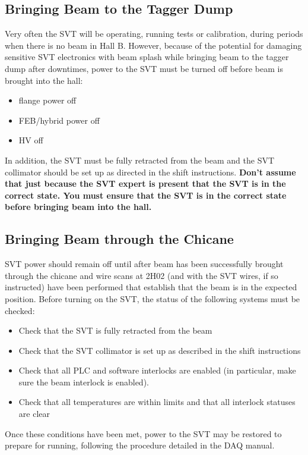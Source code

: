 \documentclass[12pt]{report}
\begin{document}
\subsection{Bringing Beam to the Tagger Dump}
Very often the SVT will be operating, running tests or calibration, during periods when there is no beam in Hall B. However, because of the potential for damaging sensitive SVT electronics with beam splash while bringing beam to the tagger dump after downtimes, power to the SVT must be turned off before beam is brought into the hall:  
\begin{itemize}
\item flange power off
\item FEB/hybrid power off
\item HV off
\end {itemize}
In addition, the SVT must be fully retracted from the beam and the SVT collimator should be set up as directed in the shift instructions.  \textbf{Don't assume that just because the SVT expert is present that the SVT is in the correct state. You must ensure that the SVT is in the correct state before bringing beam into the hall.}

\subsection{Bringing Beam through the Chicane}
SVT power should remain off until after beam has been successfully brought through the chicane and wire scans at 2H02 (and with the SVT wires, if so instructed) have been performed that establish that the beam is in the expected position. Before turning on the SVT, the status of the following systems must be checked:

\begin{itemize}
\item Check that the SVT is fully retracted from the beam
\item Check that the SVT collimator is set up as described in the shift instructions
\item Check that all PLC and software interlocks are enabled (in particular, make sure the beam interlock is enabled).
\item Check that all temperatures are within limits and that all interlock statuses are clear
\end{itemize}

Once these conditions have been met, power to the SVT may be restored to prepare for running, following the procedure detailed in the DAQ manual.
\end{document}
